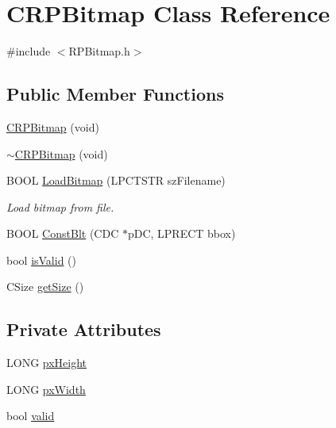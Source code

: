 \hypertarget{classCRPBitmap}{
\section{CRPBitmap Class Reference}
\label{classCRPBitmap}
}


{\ttfamily \#include $<$RPBitmap.h$>$}

\subsection*{Public Member Functions}
\begin{DoxyCompactItemize}
\item 
\hyperlink{classCRPBitmap_a310903235913a81bd4bdd545ad2857c2}{CRPBitmap} (void)
\item 
\hyperlink{classCRPBitmap_a57dcb9fa883b12a247cfb698244e6e49}{$\sim$CRPBitmap} (void)
\item 
BOOL \hyperlink{classCRPBitmap_adf08a72fa3fad57595b3cebefb22d84c}{LoadBitmap} (LPCTSTR szFilename)
\begin{DoxyCompactList}\small\item\em Load bitmap from file. \item\end{DoxyCompactList}\item 
BOOL \hyperlink{classCRPBitmap_a3c4ab4a0f60c29eb7407d2c5822f01a1}{ConstBlt} (CDC $\ast$pDC, LPRECT bbox)
\item 
bool \hyperlink{classCRPBitmap_a152fe0f76c81ee2f6fcb4305b229cece}{isValid} ()
\item 
CSize \hyperlink{classCRPBitmap_a8f818d5ee9f1ae862f98602abf3b6c9d}{getSize} ()
\end{DoxyCompactItemize}
\subsection*{Private Attributes}
\begin{DoxyCompactItemize}
\item 
LONG \hyperlink{classCRPBitmap_a5a9552e0c377152216906754d71fb0f5}{pxHeight}
\item 
LONG \hyperlink{classCRPBitmap_ad350f7f01d406da20ce9cde855008ff8}{pxWidth}
\item 
bool \hyperlink{classCRPBitmap_ad535c2abe5b4cd56543b5cb1ae7d92a9}{valid}
\end{DoxyCompactItemize}


